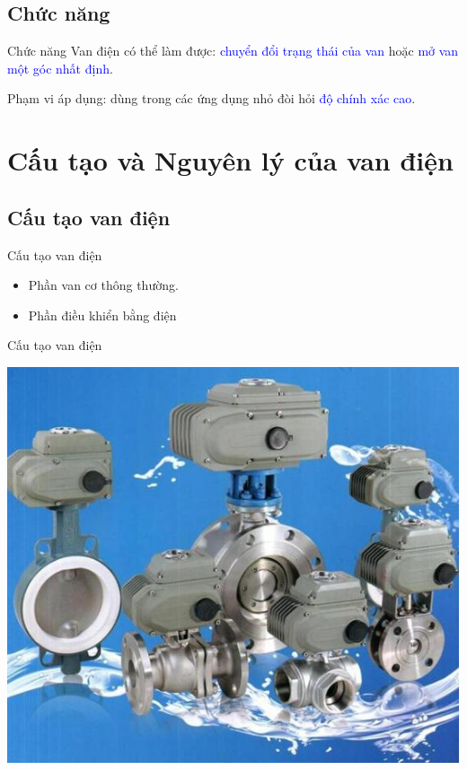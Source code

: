 \documentclass[20pt]{beamer}
\begin{document}
\subsection*{Chức năng}
\begin{frame}{Chức năng}
\justifying
\alert{Van điện có thể làm được:} \textcolor{blue}{chuyển đổi trạng thái của van} hoặc \textcolor{blue}{mở van một góc nhất định}.

\alert{Phạm vi áp dụng:} dùng trong các ứng dụng nhỏ đòi hỏi \textcolor{blue}{độ chính xác cao}.
\end{frame}

\section{Cấu tạo và Nguyên lý của van điện}
\subsection*{Cấu tạo van điện}
\begin{frame}{Cấu tạo van điện}
\begin{itemize}
	\item Phần van cơ thông thường.
	\item Phần điều khiển bằng điện
\end{itemize}
\end{frame}

\begin{frame}{Cấu tạo van điện}
	\vspace{-.3cm}
	\begin{center}
		\includegraphics[scale=.4]{images/vi-du-van-dien.png} 
	\end{center}
\end{frame}
\end{document}
